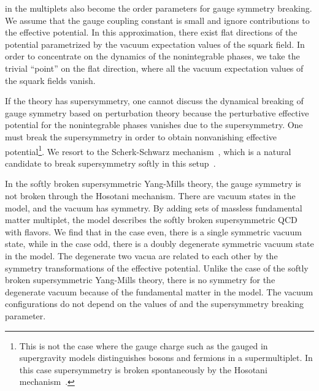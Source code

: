 \documentclass[a4paper,12pt]{article}
\begin{document}
in the multiplets also become the order parameters for gauge symmetry 
breaking. We assume that the gauge coupling constant \coordHE{} is small and 
ignore \coordHE{} contributions to the effective potential. 
In this approximation, there exist flat directions of the potential 
parametrized by the vacuum expectation values of the squark field. 
In order to concentrate on the dynamics of the
nonintegrable phases, we take the trivial ``point'' on the flat 
direction, where all the vacuum expectation values of the squark fields
vanish.
\par
If the theory has supersymmetry, one cannot discuss the dynamical breaking
of gauge symmetry based on perturbation theory because 
the perturbative effective potential for the nonintegrable
phases vanishes due to the supersymmetry. One must break the
supersymmetry in order to obtain nonvanishing effective 
potential\footnote{This is not the case where the gauge charge such 
as the gauged \coordHE{} in supergravity models
distinguishes bosons and fermions in a supermultiplet. 
In this case supersymmetry is broken spontaneously by the 
Hosotani mechanism~\cite{riotto}.}. We resort to the Scherk-Schwarz 
mechanism~\cite{ss, fi}, which is a natural candidate to 
break supersymmetry softly in this setup~\cite{takenagac}.
\par
In the softly broken supersymmetric Yang-Mills theory, the \coordHE{} gauge
symmetry is not broken through the Hosotani mechanism. There are \coordHE{} vacuum
states in the model, and the vacuum has \coordHE{} symmetry. By adding 
\coordHE{} sets of massless fundamental matter multiplet, the model 
describes the softly broken supersymmetric QCD with \coordHE{} flavors.
We find that in the case \coordHE{} even, there is a single \coordHE{} symmetric 
vacuum state, while in the case \coordHE{} odd, there 
is a doubly degenerate \coordHE{} symmetric vacuum state in the model. 
The degenerate two vacua are related to each other by the symmetry
transformations of the effective potential.
Unlike the case of the softly broken supersymmetric Yang-Mills theory,
there is no \coordHE{} symmetry for the degenerate vacuum 
because of the fundamental matter in the model.
The vacuum configurations do not depend on 
the values of \coordHE{} and the supersymmetry breaking parameter.
\end{document}
